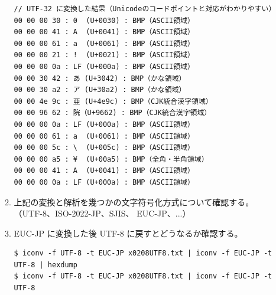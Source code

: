 \documentclass[a4j,dvipdfmx]{jarticle}
\begin{document}
\begin{enumerate}
\begin{enumerate}
\begin{lstlisting}[numbers=none]
// UTF-32 に変換した結果（Unicodeのコードポイントと対応がわかりやすい）
00 00 00 30 : 0  (U+0030) : BMP（ASCII領域）
00 00 00 41 : A  (U+0041) : BMP（ASCII領域）
00 00 00 61 : a  (U+0061) : BMP（ASCII領域）
00 00 00 21 : !  (U+0021) : BMP（ASCII領域）
00 00 00 0a : LF (U+000a) : BMP（ASCII領域）
00 00 30 42 : あ (U+3042) : BMP（かな領域）
00 00 30 a2 : ア (U+30a2) : BMP（かな領域）
00 00 4e 9c : 亜 (U+4e9c) : BMP（CJK統合漢字領域）
00 00 96 62 : 院（U+9662) : BMP（CJK統合漢字領域）
00 00 00 0a : LF (U+000a) : BMP（ASCII領域）
00 00 00 61 : a  (U+0061) : BMP（ASCII領域）
00 00 00 5c : \  (U+005c) : BMP（ASCII領域）
00 00 00 a5 : ¥  (U+00a5) : BMP（全角・半角領域）
00 00 00 41 : A  (U+0041) : BMP（ASCII領域）
00 00 00 0a : LF (U+000a) : BMP（ASCII領域）
\end{lstlisting}

\item 上記の変換と解析を幾つかの文字符号化方式について確認する。
（UTF-8、ISO-2022-JP、SJIS、 EUC-JP、...）

\item EUC-JP に変換した後 UTF-8 に戻すとどうなるか確認する。

\begin{lstlisting}[numbers=none]
$ iconv -f UTF-8 -t EUC-JP x0208UTF8.txt | iconv -f EUC-JP -t UTF-8 | hexdump
$ iconv -f UTF-8 -t EUC-JP x0208UTF8.txt | iconv -f EUC-JP -t UTF-8
\end{lstlisting}

\end{enumerate}

%

\end{enumerate}
\end{document}
